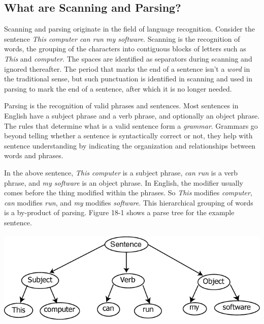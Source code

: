 \subsection{What are Scanning and Parsing?}

Scanning and parsing originate in the field of language recognition.
Consider the sentence \textit{This computer can run my software}.
Scanning is the recognition of words, the grouping of the characters
into contiguous blocks of letters such as \textit{This} and
\textit{computer}.  The spaces are identified as separators
during scanning and ignored thereafter. The period that marks the end
of a sentence isn't a {\em word\/} in the traditional sense, but
such punctuation is identified in scanning and used in parsing to
mark the end of a sentence, after which it is no longer needed.

Parsing is the recognition of valid phrases and sentences. Most
sentences in English have a subject phrase and a verb phrase, and
optionally an object phrase. The rules that determine what is a valid
sentence form a {\em grammar\/}. Grammars go beyond telling whether
a sentence is syntactically correct or not, they help with sentence
understanding by indicating the organization and relationships between
words and phrases.

In the above sentence, \textit{This computer} is a
subject phrase, \textit{can run} is a verb phrase, and \textit{my
software} is an object phrase. In English, the modifier usually
comes before the 
thing modified within the phrases. So \textit{This} modifies
\textit{computer}, \textit{can} modifies \textit{run}, and \textit{my}
modifies \textit{software}. This hierarchical grouping of words is a
by-product of parsing. Figure 18-1 shows a parse tree for
the example sentence.


\bigskip

\begin{center}
\includegraphics[width=5.4362in,height=1.7846in]{ub-img/ub-img64.png}
\end{center}

